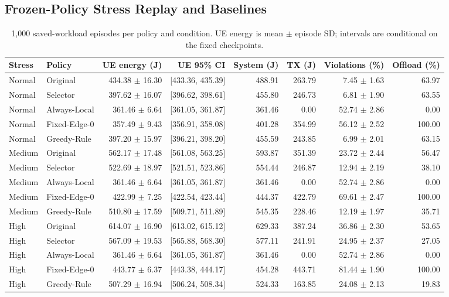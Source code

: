 \documentclass[conference]{IEEEtran}
\begin{document}
\subsection{Frozen-Policy Stress Replay and Baselines}
\begin{table}[t]
\centering\footnotesize
\caption{1,000 saved-workload episodes per policy and condition. UE energy is mean $\pm$ episode SD; intervals are conditional on the fixed checkpoints.}
\label{tab:main}
\begin{tabular}{@{}llrrrrrr@{}}\toprule
Stress & Policy & UE energy (J) & UE 95\% CI & System (J) & TX (J) & Violations (\%) & Offload (\%)\\\midrule
Normal & Original & 434.38 $\pm$ 16.30 & [433.36, 435.39] & 488.91 & 263.79 & 7.45 $\pm$ 1.63 & 63.97 \\
Normal & Selector & 397.62 $\pm$ 16.07 & [396.62, 398.61] & 455.80 & 246.73 & 6.81 $\pm$ 1.90 & 63.55 \\
Normal & Always-Local & 361.46 $\pm$ 6.64 & [361.05, 361.87] & 361.46 & 0.00 & 52.74 $\pm$ 2.86 & 0.00 \\
Normal & Fixed-Edge-0 & 357.49 $\pm$ 9.43 & [356.91, 358.08] & 401.28 & 354.99 & 56.12 $\pm$ 2.52 & 100.00 \\
Normal & Greedy-Rule & 397.20 $\pm$ 15.97 & [396.21, 398.20] & 455.59 & 243.85 & 6.99 $\pm$ 2.01 & 63.15 \\
Medium & Original & 562.17 $\pm$ 17.48 & [561.08, 563.25] & 593.87 & 351.39 & 23.72 $\pm$ 2.44 & 56.47 \\
Medium & Selector & 522.69 $\pm$ 18.97 & [521.51, 523.86] & 554.44 & 246.87 & 12.94 $\pm$ 2.19 & 38.10 \\
Medium & Always-Local & 361.46 $\pm$ 6.64 & [361.05, 361.87] & 361.46 & 0.00 & 52.74 $\pm$ 2.86 & 0.00 \\
Medium & Fixed-Edge-0 & 422.99 $\pm$ 7.25 & [422.54, 423.44] & 444.37 & 422.79 & 69.61 $\pm$ 2.47 & 100.00 \\
Medium & Greedy-Rule & 510.80 $\pm$ 17.59 & [509.71, 511.89] & 545.35 & 228.46 & 12.19 $\pm$ 1.97 & 35.71 \\
High & Original & 614.07 $\pm$ 16.90 & [613.02, 615.12] & 629.33 & 387.24 & 36.86 $\pm$ 2.30 & 53.65 \\
High & Selector & 567.09 $\pm$ 19.53 & [565.88, 568.30] & 577.11 & 241.91 & 24.95 $\pm$ 2.37 & 27.05 \\
High & Always-Local & 361.46 $\pm$ 6.64 & [361.05, 361.87] & 361.46 & 0.00 & 52.74 $\pm$ 2.86 & 0.00 \\
High & Fixed-Edge-0 & 443.77 $\pm$ 6.37 & [443.38, 444.17] & 454.28 & 443.71 & 81.44 $\pm$ 1.90 & 100.00 \\
High & Greedy-Rule & 507.29 $\pm$ 16.94 & [506.24, 508.34] & 524.33 & 163.85 & 24.08 $\pm$ 2.13 & 19.83 \\
\bottomrule\end{tabular}
\end{table}
\end{document}
